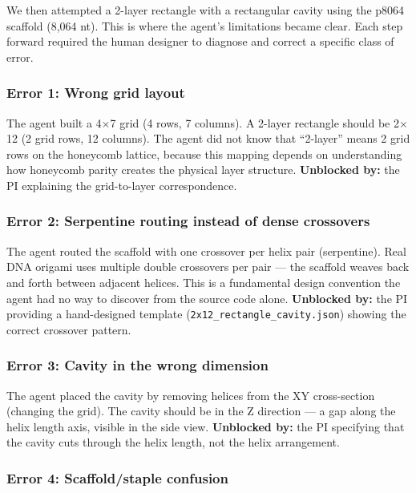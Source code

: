\documentclass[
  11pt,
]{article}
\begin{document}
We then attempted a 2-layer rectangle with a rectangular cavity using
the p8064 scaffold (8,064 nt). This is where the agent's limitations
became clear. Each step forward required the human designer to diagnose
and correct a specific class of error.

\subsubsection{Error 1: Wrong grid
layout}\label{error-1-wrong-grid-layout}

The agent built a 4$\times$7 grid (4 rows, 7 columns). A 2-layer rectangle
should be 2$\times$12 (2 grid rows, 12 columns). The agent did not know that
``2-layer'' means 2 grid rows on the honeycomb lattice, because this
mapping depends on understanding how honeycomb parity creates the
physical layer structure. \textbf{Unblocked by:} the PI explaining the
grid-to-layer correspondence.

\subsubsection{Error 2: Serpentine routing instead of dense
crossovers}\label{error-2-serpentine-routing-instead-of-dense-crossovers}

The agent routed the scaffold with one crossover per helix pair
(serpentine). Real DNA origami uses multiple double crossovers per pair
--- the scaffold weaves back and forth between adjacent helices. This is
a fundamental design convention the agent had no way to discover from
the source code alone. \textbf{Unblocked by:} the PI providing a
hand-designed template (\texttt{2x12\_rectangle\_cavity.json}) showing
the correct crossover pattern.

\subsubsection{Error 3: Cavity in the wrong
dimension}\label{error-3-cavity-in-the-wrong-dimension}

The agent placed the cavity by removing helices from the XY
cross-section (changing the grid). The cavity should be in the Z
direction --- a gap along the helix length axis, visible in the side
view. \textbf{Unblocked by:} the PI specifying that the cavity cuts
through the helix length, not the helix arrangement.

\subsubsection{Error 4: Scaffold/staple
confusion}\label{error-4-scaffoldstaple-confusion}
\end{document}
